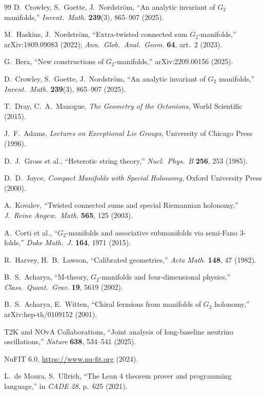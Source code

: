 \begin{thebibliography}{99}
 D.~Crowley, S.~Goette, J.~Nordstr\"om, ``An analytic invariant of $G_2$ manifolds,'' \textit{Invent.\ Math.} \textbf{239}(3), 865--907 (2025).

 M.~Haskins, J.~Nordstr\"om, ``Extra-twisted connected sum $G_2$-manifolds,'' arXiv:1809.09083 (2022); \textit{Ann.\ Glob.\ Anal.\ Geom.} \textbf{64}, art.\ 2 (2023).

 G.~Bera, ``New constructions of $G_2$-manifolds,'' arXiv:2209.00156 (2025).

 D.~Crowley, S.~Goette, J.~Nordstr\"om, ``An analytic invariant of $G_2$ manifolds,'' \textit{Invent.\ Math.} \textbf{239}(3), 865--907 (2025).

 T.~Dray, C.~A.~Manogue, \textit{The Geometry of the Octonions}, World Scientific (2015).

 J.~F.~Adams, \textit{Lectures on Exceptional Lie Groups}, University of Chicago Press (1996).

 D.~J.~Gross et al., ``Heterotic string theory,'' \textit{Nucl.\ Phys.\ B} \textbf{256}, 253 (1985).

 D.~D.~Joyce, \textit{Compact Manifolds with Special Holonomy}, Oxford University Press (2000).

 A.~Kovalev, ``Twisted connected sums and special Riemannian holonomy,'' \textit{J.\ Reine Angew.\ Math.} \textbf{565}, 125 (2003).

 A.~Corti et al., ``$G_2$-manifolds and associative submanifolds via semi-Fano 3-folds,'' \textit{Duke Math.\ J.} \textbf{164}, 1971 (2015).

 R.~Harvey, H.~B.~Lawson, ``Calibrated geometries,'' \textit{Acta Math.} \textbf{148}, 47 (1982).

 B.~S.~Acharya, ``M-theory, $G_2$-manifolds and four-dimensional physics,'' \textit{Class.\ Quant.\ Grav.} \textbf{19}, 5619 (2002).

 B.~S.~Acharya, E.~Witten, ``Chiral fermions from manifolds of $G_2$ holonomy,'' arXiv:hep-th/0109152 (2001).

 T2K and NOvA Collaborations, ``Joint analysis of long-baseline neutrino oscillations,'' \textit{Nature} \textbf{638}, 534--541 (2025).

 NuFIT 6.0, \url{https://www.nu-fit.org} (2024).

 L.~de Moura, S.~Ullrich, ``The Lean 4 theorem prover and programming language,'' in \textit{CADE 28}, p.\ 625 (2021).


\end{thebibliography}
